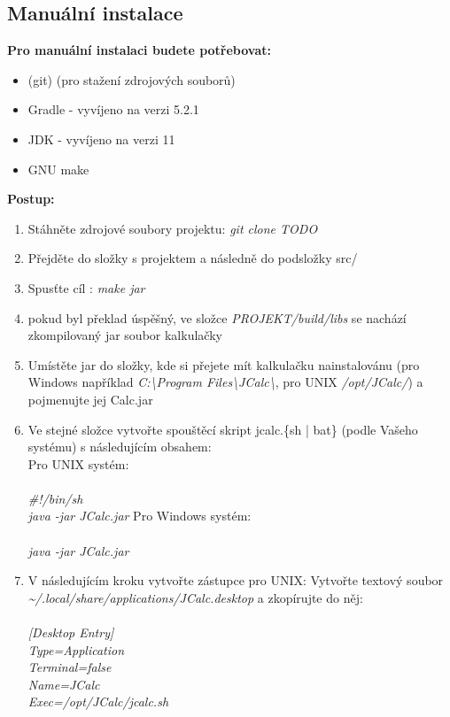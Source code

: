 \documentclass[a4paper, 11pt]{article}
\begin{document}
\subsection{Manuální instalace}

\textbf{Pro manuální instalaci budete potřebovat:}

\begin{itemize}
	\item (git) (pro stažení zdrojových souborů)
	\item Gradle - vyvíjeno na verzi 5.2.1
	\item JDK - vyvíjeno na verzi 11
	\item GNU make
\end{itemize}

\noindent
\textbf{Postup:}

\begin{enumerate}
	\item Stáhněte zdrojové soubory projektu: \emph{git clone TODO}
	\item Přejděte do složky s projektem a následně do podsložky src/
	\item Spusťte cíl : \emph{make jar}
	\item pokud byl překlad úspěšný, ve složce \emph{PROJEKT/build/libs} se nachází zkompilovaný jar soubor kalkulačky
	\item Umístěte jar do složky, kde si přejete mít kalkulačku nainstalovánu (pro Windows například \emph{C:\textbackslash Program Files\textbackslash JCalc\textbackslash}, pro UNIX \emph{/opt/JCalc/}) a pojmenujte jej Calc.jar
	\item Ve stejné složce vytvořte spouštěcí skript jcalc.\{sh | bat\} (podle Vašeho systému) s následujícím obsahem:\\
		\subitem Pro UNIX systém:\\\\
			\emph{\#!/bin/sh\\
				java -jar JCalc.jar}
		\subitem Pro Windows systém:\\\\
			\emph{java -jar JCalc.jar}

	\item V následujícím kroku vytvořte zástupce
		\subitem pro UNIX:
			\subsubitem Vytvořte textový soubor \emph{\textasciitilde/.local/share/applications/JCalc.desktop} a zkopírujte do něj:\\\\
						\emph{
						[Desktop Entry]\\
						Type=Application\\
						Terminal=false\\
						Name=JCalc\\
						Exec=/opt/JCalc/jcalc.sh\\
						}


\end{enumerate}
\end{document}
